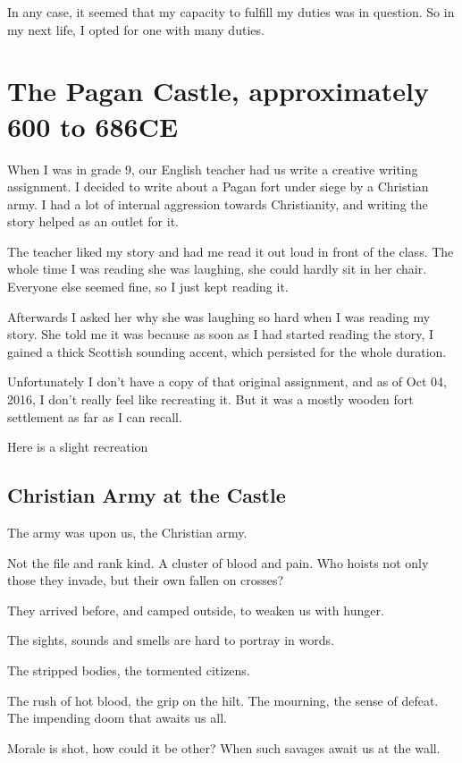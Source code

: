 In any case, it seemed that my capacity to fulfill my duties was in question. So
in my next life, I opted for one with many duties.

\chapter{The Pagan Castle, approximately 600 to 686CE}\label{reincarnation:arwald}
When I was in grade 9, our English teacher had us write a creative writing
assignment. I decided to write about a Pagan fort under siege by a Christian
army.  I had a lot of internal aggression towards Christianity, and writing the
story helped as an outlet for it. 

The teacher liked my story and had me read it out loud in front of the class.
The whole time I was reading she was laughing, she could hardly sit in her
chair. Everyone else seemed fine, so I just kept reading it. 

Afterwards I asked her why she was laughing so hard when I was reading my story. 
She told me it was because as soon as I had started reading the story, I gained
a thick Scottish sounding accent, which persisted for the whole duration. 

Unfortunately I don't have a copy of that original assignment, and as of Oct
04, 2016, I don't really feel like recreating it. But it was a mostly wooden 
fort settlement as far as I can recall. 

Here is a slight recreation

\section{Christian Army at the Castle}
The army was upon us, the Christian army.

Not the file and rank kind. A cluster of blood and pain. 
Who hoists not only those they invade, but their own fallen on crosses?

They arrived before, and camped outside, to weaken us with hunger. 

The sights, sounds and smells are hard to portray in words. 

The stripped bodies, the tormented citizens. 

The rush of hot blood, the grip on the hilt. The mourning, the sense of defeat. 
The impending doom that awaits us all. 

Morale is shot, how could it be other? When such savages await us at the wall.

